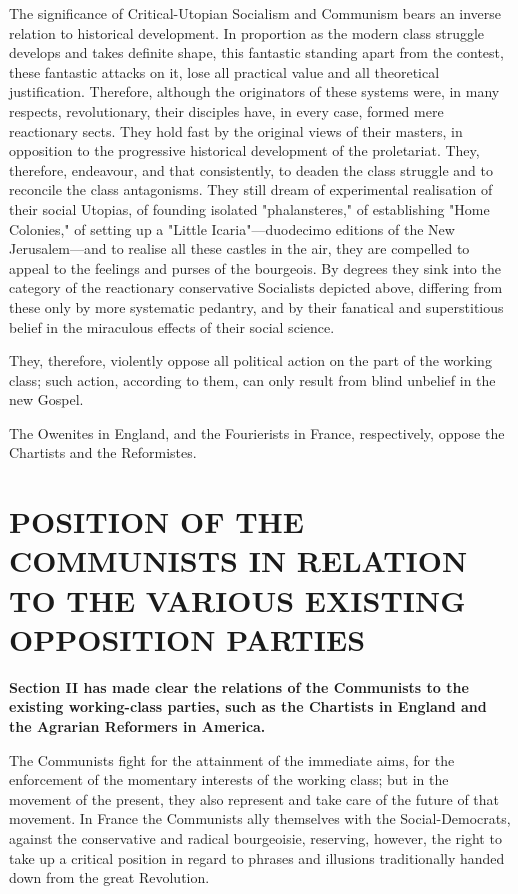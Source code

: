 \documentclass[, oneside]{article}   	%
\begin{document}
The significance of Critical-Utopian Socialism and Communism bears an inverse relation to historical development. In proportion as the modern class struggle develops and takes definite shape, this fantastic standing apart from the contest, these fantastic attacks on it, lose all practical value and all theoretical justification. Therefore, although the originators of these systems were, in many respects, revolutionary, their disciples have, in every case, formed mere reactionary sects. They hold fast by the original views of their masters, in opposition to the progressive historical development of the proletariat. They, therefore, endeavour, and that consistently, to deaden the class struggle and to reconcile the class antagonisms. They still dream of experimental realisation of their social Utopias, of founding isolated "phalansteres," of establishing "Home Colonies," of setting up a "Little Icaria"---duodecimo editions of the New Jerusalem---and to realise all these castles in the air, they are compelled to appeal to the feelings and purses of the bourgeois. By degrees they sink into the category of the reactionary conservative Socialists depicted above, differing from these only by more systematic pedantry, and by their fanatical and superstitious belief in the miraculous effects of their social science.

They, therefore, violently oppose all political action on the part of the working class; such action, according to them, can only result from blind unbelief in the new Gospel.

The Owenites in England, and the Fourierists in France, respectively, oppose the Chartists and the Reformistes.

\section{POSITION OF THE COMMUNISTS IN RELATION TO THE VARIOUS EXISTING OPPOSITION PARTIES}
\small{\textbf{Section II has made clear the relations of the Communists to the existing working-class parties, such as the Chartists in England and the Agrarian Reformers in America.}}

The Communists fight for the attainment of the immediate aims, for the enforcement of the momentary interests of the working class; but in the movement of the present, they also represent and take care of the future of that movement. In France the Communists ally themselves with the Social-Democrats, against the conservative and radical bourgeoisie, reserving, however, the right to take up a critical position in regard to phrases and illusions traditionally handed down from the great Revolution.
\end{document}
